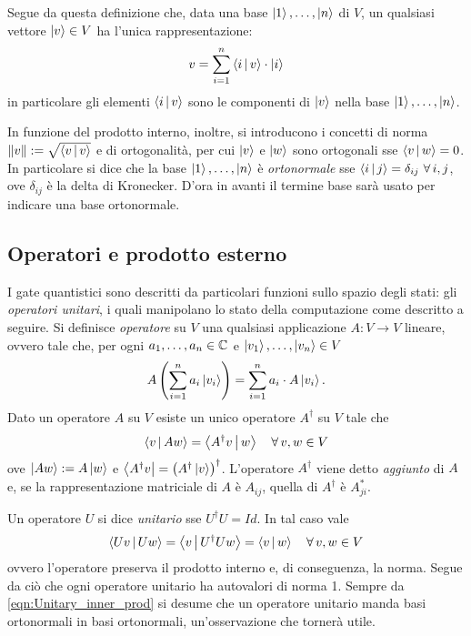Segue da questa definizione che, data una base $\ket{1}, \dots, \ket{n}$ di $V$, un qualsiasi vettore $\ket{v} \in V$ ha l'unica rappresentazione:
\begin{align*}
 v = \sum_{i=1}^n \braket{i\,}{\, v} \cdot \ket{i}
\end{align*}
in particolare gli elementi $\braket{i\,}{\, v}$ sono le componenti di $\ket{v}$ nella base $\ket{1}, \dots, \ket{n}$.

In funzione del prodotto interno, inoltre, si introducono i concetti di norma ${\norm{v}} := {\sqrt{\braket{v\,}{\, v}}}$ e di ortogonalità, per cui $\ket{v}$ e $\ket{w}$ sono ortogonali sse ${\braket{v\,}{\, w} = 0}$.
In particolare si dice che la base $\ket{1}, \dots, \ket{n}$ è \textit{ortonormale} sse ${\braket{i\,}{\, j} = \delta_{ij}} \ \forall \, i,j$, ove $\delta_{ij}$ è la delta di Kronecker.
D'ora in avanti il termine base sarà usato per indicare una base ortonormale.

\subsection{Operatori e prodotto esterno}
I gate quantistici sono descritti da particolari funzioni sullo spazio degli stati: gli \textit{operatori unitari}, i quali manipolano lo stato della computazione come descritto a seguire.
Si definisce \textit{operatore} su $V$ una qualsiasi applicazione $A: V \to V$ lineare, ovvero tale che, per ogni $a_1, \dotsc, a_n \in \mathbb{C}^{}$ e $\ket{v_1}, \dotsc, \ket{v_n} \in V$
\begin{align*}
 A\left(\sum_{i = 1}^n a_i \ket{v_i}\right) = \sum_{i = 1}^n a_i \cdot A\ket{v_i}.
\end{align*}
Dato un operatore $A$ su $V$ esiste un unico operatore $A^\dagger$ su $V$ tale che
\begin{align*}
 \braket{v\,}{\, Aw} = \braket{A^\dagger v\,}{\, w} \quad \forall\, v,w \in V
\end{align*}
ove $\ket{Aw} := A\ket{w}$ e $\bra{A^\dagger v} = \left(A^\dagger \ket{v} \right)^\dagger $. L'operatore $A^\dagger$ viene detto \textit{aggiunto} di $A$ e, se la rappresentazione matriciale di $A$ è $A_{ij}$, quella di $A^\dagger$ è $A_{ji}^*$.

Un operatore $U$ si dice \textit{unitario} sse $U^\dagger U = Id$. In tal caso vale
\begin{equation}\label{eqn:Unitary_inner_prod}
 \braket{Uv\,}{\, Uw} = \braket{v\,}{\, U^\dagger U w} = \braket{v\,}{\, w} \quad \forall\, v,w \in V
\end{equation}
ovvero l'operatore preserva il prodotto interno e, di conseguenza, la norma. Segue da ciò che ogni operatore unitario ha autovalori di norma 1.
Sempre da \eqref{eqn:Unitary_inner_prod} si desume che un operatore unitario manda basi ortonormali in basi ortonormali, un'osservazione che tornerà utile.

